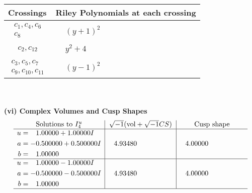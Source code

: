 \documentclass[1p]{elsarticle_modified}
\theoremstyle{definition}
\newcommand{\I}{\sqrt{-1}}
\begin{document}
\begin{tabular}{m{50pt}|m{274pt}}
Crossings & \hspace{64pt}Riley Polynomials at each crossing \\
\hline $$\begin{aligned}c_{1},c_{4},c_{6}\\c_{8}\end{aligned}$$&$\begin{aligned}
&(y+1)^2
\end{aligned}$\\
\hline $$\begin{aligned}c_{2},c_{12}\end{aligned}$$&$\begin{aligned}
&y^2+4
\end{aligned}$\\
\hline $$\begin{aligned}c_{3},c_{5},c_{7}\\c_{9},c_{10},c_{11}\end{aligned}$$&$\begin{aligned}
&(y-1)^2
\end{aligned}$\\
\hline
\end{tabular}\\~\\
\newpage\flushleft \textbf{(vi) Complex Volumes and Cusp Shapes}
$$\begin{array}{c|c|c}  
\text{Solutions to }I^u_{4}& \I (\text{vol} + \sqrt{-1}CS) & \text{Cusp shape}\\
 \hline 
\begin{aligned}
u &= \phantom{-}1.00000 + 1.00000 I \\
a &= -0.500000 + 0.500000 I \\
b &= \phantom{-}1.00000\phantom{ +0.000000I}\end{aligned}
 & \phantom{-}4.93480\phantom{ +0.000000I} & \phantom{-}4.00000\phantom{ +0.000000I} \\ \hline\begin{aligned}
u &= \phantom{-}1.00000 - 1.00000 I \\
a &= -0.500000 - 0.500000 I \\
b &= \phantom{-}1.00000\phantom{ +0.000000I}\end{aligned}
 & \phantom{-}4.93480\phantom{ +0.000000I} & \phantom{-}4.00000\phantom{ +0.000000I}\\
 \hline 
 \end{array}$$\newpage\newpage\renewcommand{\arraystretch}{1}
\end{document}
